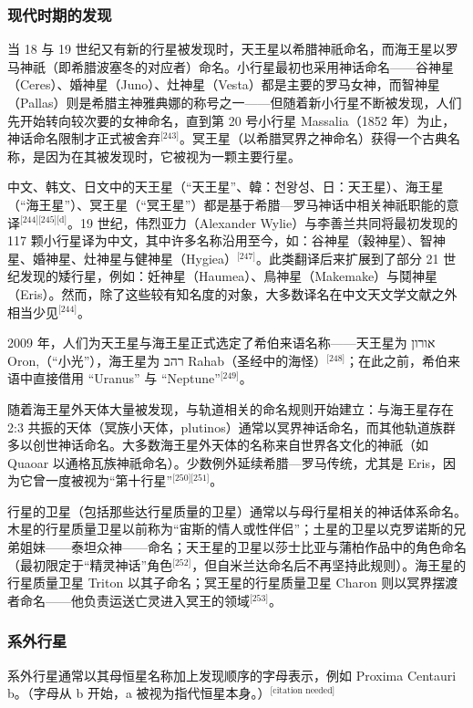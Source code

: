 \subsubsection{现代时期的发现}
当 18 与 19 世纪又有新的行星被发现时，天王星以希腊神祇命名，而海王星以罗马神祇（即希腊波塞冬的对应者）命名。小行星最初也采用神话命名——谷神星（Ceres）、婚神星（Juno）、灶神星（Vesta）都是主要的罗马女神，而智神星（Pallas）则是希腊主神雅典娜的称号之一——但随着新小行星不断被发现，人们先开始转向较次要的女神命名，直到第 20 号小行星 Massalia（1852 年）为止，神话命名限制才正式被舍弃\(^\text{[243]}\)。冥王星（以希腊冥界之神命名）获得一个古典名称，是因为在其被发现时，它被视为一颗主要行星。

中文、韩文、日文中的天王星（“天王星”、韓：천왕성、日：天王星）、海王星（“海王星”）、冥王星（“冥王星”）都是基于希腊—罗马神话中相关神祇职能的意译\(^\text{[244][245][d]}\)。19 世纪，伟烈亚力（Alexander Wylie）与李善兰共同将最初发现的 117 颗小行星译为中文，其中许多名称沿用至今，如：谷神星（穀神星）、智神星、婚神星、灶神星与健神星（Hygiea）\(^\text{[247]}\)。此类翻译后来扩展到了部分 21 世纪发现的矮行星，例如：妊神星（Haumea）、鳥神星（Makemake）与鬩神星（Eris）。然而，除了这些较有知名度的对象，大多数译名在中文天文学文献之外相当少见\(^\text{[244]}\)。

2009 年，人们为天王星与海王星正式选定了希伯来语名称——天王星为 אורון Oron,（“小光”），海王星为 רהב Rahab（圣经中的海怪）\(^\text{[248]}\)；在此之前，希伯来语中直接借用 “Uranus” 与 “Neptune”\(^\text{[249]}\)。

随着海王星外天体大量被发现，与轨道相关的命名规则开始建立：与海王星存在 2:3 共振的天体（冥族小天体，plutinos）通常以冥界神话命名，而其他轨道族群多以创世神话命名。大多数海王星外天体的名称来自世界各文化的神祇（如 Quaoar 以通格瓦族神祇命名）。少数例外延续希腊—罗马传统，尤其是 Eris，因为它曾一度被视为“第十行星”\(^\text{[250][251]}\)。

行星的卫星（包括那些达行星质量的卫星）通常以与母行星相关的神话体系命名。木星的行星质量卫星以前称为“宙斯的情人或性伴侣”；土星的卫星以克罗诺斯的兄弟姐妹——泰坦众神——命名；天王星的卫星以莎士比亚与蒲柏作品中的角色命名（最初限定于“精灵神话”角色\(^\text{[252]}\)，但自米兰达命名后不再坚持此规则）。海王星的行星质量卫星 Triton 以其子命名；冥王星的行星质量卫星 Charon 则以冥界摆渡者命名——他负责运送亡灵进入冥王的领域\(^\text{[253]}\)。
\subsubsection{系外行星}
系外行星通常以其母恒星名称加上发现顺序的字母表示，例如 Proxima Centauri b。（字母从 b 开始，a 被视为指代恒星本身。）\(^\text{[citation needed]}\)
